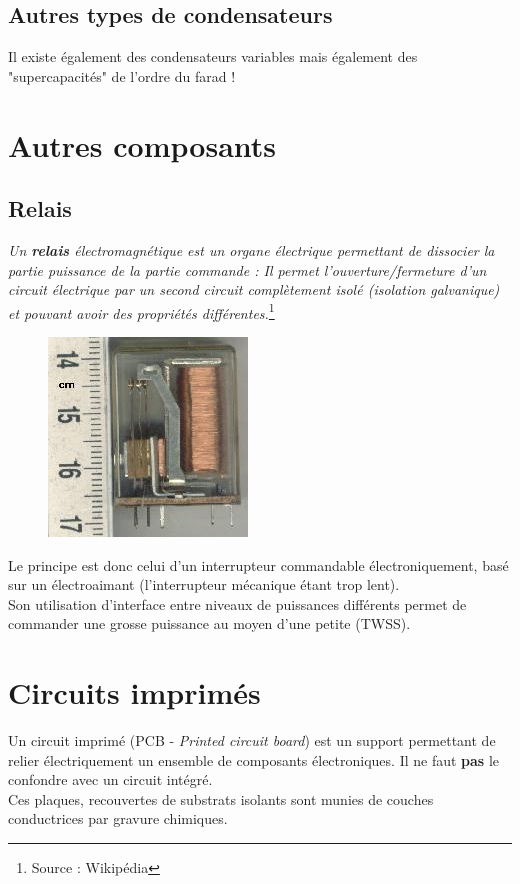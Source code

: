 \documentclass	[11pt, a4paper, openany]{book}
\begin{document}
\subsection{Autres types de condensateurs}
Il existe également des condensateurs variables mais également des "supercapacités" de l'ordre du farad ! 


\section{Autres composants}
\subsection{Relais}

\textit{Un \textbf{relais} électromagnétique est un organe électrique permettant de dissocier la partie puissance de la partie commande  : Il permet l'ouverture/fermeture d'un circuit électrique par un second circuit complètement isolé (isolation galvanique) et pouvant avoir des propriétés différentes.}\footnote{Source : Wikipédia}\\

\begin{figure}
\includegraphics[scale=0.25]{img/image35}
\end{figure}Le principe est donc celui d'un interrupteur commandable électroniquement, basé sur un électroaimant (l'interrupteur mécanique étant trop lent).\\
Son utilisation d'interface entre niveaux de puissances différents permet de commander une grosse puissance au moyen d'une petite (TWSS).


\section{Circuits imprimés}
Un circuit imprimé (PCB - \textit{Printed circuit board}) est un support permettant de relier électriquement un ensemble de composants électroniques. Il ne faut \textbf{pas} le confondre avec un circuit intégré.\\
Ces plaques, recouvertes de substrats isolants sont munies de couches conductrices par gravure chimiques. 
\end{document}
